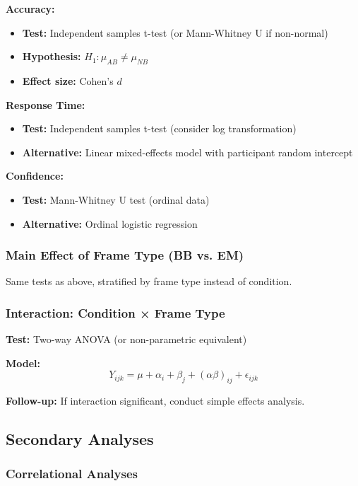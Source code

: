 \documentclass[12pt,a4paper]{article}
\begin{document}
\textbf{Accuracy:}
\begin{itemize}
    \item \textbf{Test:} Independent samples t-test (or Mann-Whitney U if non-normal)
    \item \textbf{Hypothesis:} $H_1: \mu_{AB} \neq \mu_{NB}$
    \item \textbf{Effect size:} Cohen's $d$
\end{itemize}

\textbf{Response Time:}
\begin{itemize}
    \item \textbf{Test:} Independent samples t-test (consider log transformation)
    \item \textbf{Alternative:} Linear mixed-effects model with participant random intercept
\end{itemize}

\textbf{Confidence:}
\begin{itemize}
    \item \textbf{Test:} Mann-Whitney U test (ordinal data)
    \item \textbf{Alternative:} Ordinal logistic regression
\end{itemize}

\subsubsection{Main Effect of Frame Type (BB vs. EM)}

Same tests as above, stratified by frame type instead of condition.

\subsubsection{Interaction: Condition × Frame Type}

\textbf{Test:} Two-way ANOVA (or non-parametric equivalent)

\textbf{Model:}
\begin{equation}
Y_{ijk} = \mu + \alpha_i + \beta_j + (\alpha\beta)_{ij} + \epsilon_{ijk}
\end{equation}

\textbf{Follow-up:} If interaction significant, conduct simple effects analysis.

\subsection{Secondary Analyses}

\subsubsection{Correlational Analyses}
\end{document}
